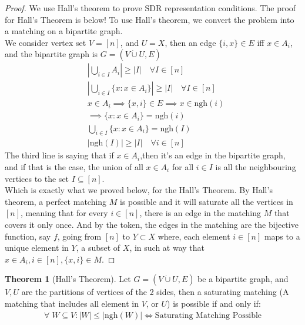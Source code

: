 \documentclass[]{article}
\theoremstyle{definition}
\newtheorem{theorem}{Theorem}       %
\begin{document}
    \begin{proof}
        We use Hall's theorem to prove SDR representation conditions. The proof for Hall's Theorem is below! To use Hall's theorem, we convert the problem into a matching on a bipartite graph. 
        \\[1.1em]
        We consider vertex set $V = [n]$, and $U = X$, then an edge $\{i, x\} \in E$ iff $x\in A_i$, and the bipartite graph is $G = (V\dot\cup U, E)$
        \begin{align}
            & \left|
                \bigcup_{i\in I} A_i
            \right| \ge |I| 
            \quad
            \forall I \in [n]
            \\
            & \left|
                \bigcup_{i\in I} \{x: x\in A_i\}
            \right| \ge |I| 
            \quad
            \forall I \in [n]
            \\
            & x\in A_i \implies \{x, i\}\in E \implies x \in \text{ngh}(i)
            \\
            & \implies \{x: x\in A_i\} = \text{ngh}(i)
            \\
            & \bigcup_{i \in I} \{x: x\in A_i\} = \text{ngh}(I)
            \\
            & |\text{ngh}(I)|\ge |I|\quad \forall i \in [n]
        \end{align}
        The third line is saying that if $x\in A_i$,then it's an edge in the bipartite graph, and if that is the case, the union of all $x\in A_i$ for all $i\in I$ is all the neighbouring vertices to the set $I\subseteq [n]$. 
        \\[1.1em]
        Which is exactly what we proved below, for the Hall's Theorem. By Hall's theorem, a perfect matching $M$ is possible and it will saturate all the vertices in $[n]$, meaning that for every $i\in [n]$, there is an edge in the matching $M$ that covers it only once. And by the token, the edges in the matching are the bijective function, say $f$, going from $[n]$ to $Y\subset X$ where, each element $i\in [n]$ maps to a unique element in $Y$, a subset of $X$, in such at way that $x\in A_i, i\in [n], \{x, i\}\in M$. 
    \end{proof}
    \begin{theorem}[Hall's Theorem]
        Let $G = (V\dot{\cup} U, E)$ be a bipartite graph, and $V, U$ are the partitions of vertices of the 2 sides, then a saturating matching (A matching that includes all element in $V$, or $U$) is possible if and only if: 
        \begin{align}
            \forall\; W \subseteq V: 
            |W| \le |\text{ngh}(W)| \iff 
            \text{Saturating Matching Possible}
        \end{align}
    \end{theorem}
\end{document}

